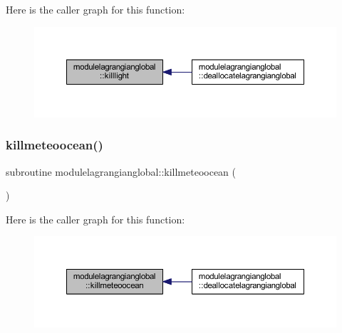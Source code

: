 Here is the caller graph for this function\+:\nopagebreak
\begin{figure}[H]
\begin{center}
\leavevmode
\includegraphics[width=350pt]{namespacemodulelagrangianglobal_ae738cd408e31ba7ac9158f7d3e11b53a_icgraph}
\end{center}
\end{figure}
\mbox{\label{namespacemodulelagrangianglobal_a554a65c3f7ed6c27bff5e766338687d5}} 
\subsubsection{\texorpdfstring{killmeteoocean()}{killmeteoocean()}}
{\footnotesize\ttfamily subroutine modulelagrangianglobal\+::killmeteoocean (\begin{DoxyParamCaption}{ }\end{DoxyParamCaption})\hspace{0.3cm}{\ttfamily [private]}}

Here is the caller graph for this function\+:\nopagebreak
\begin{figure}[H]
\begin{center}
\leavevmode
\includegraphics[width=350pt]{namespacemodulelagrangianglobal_a554a65c3f7ed6c27bff5e766338687d5_icgraph}
\end{center}
\end{figure}
\mbox{\label{namespacemodulelagrangianglobal_a8d6c65d3eba55f99706d464f633f31b3}} 
